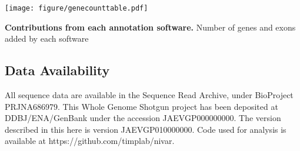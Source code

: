 \begin{kframe}
\begin{alltt}
 \hlkwb{<-} 
 \hlkwb{<-} 
 \hlkwb{<-} 
 \hlkwb{<-} 
 \hlkwb{<-} 
 \hlkwb{<-} 

 \hlkwb{<-} \hlstd{(} \hlstr{'.pdf\}
\textbackslash{}\textbackslash{}caption['}\hlstr{']\{\{\textbackslash{}\textbackslash{}bf '}\hlstd{)}
\end{alltt}
\end{kframe}\begin{table}[!ht]
\centering
\texttt{[image: figure/genecounttable.pdf]}
\caption[Contributions from each annotation software]{{\bf Contributions from each annotation software.} Number of genes and exons added by each software }
\label{tab:genecounttable}
\end{table}


\subsection{Data Availability}
\label{sec:methods}

All sequence data are available in the Sequence Read Archive, under BioProject PRJNA686979. This Whole Genome Shotgun project has been deposited at DDBJ/ENA/GenBank under the accession JAEVGP000000000. The version described in this here is version JAEVGP010000000. Code used for analysis is available at https://github.com/timplab/nivar.
